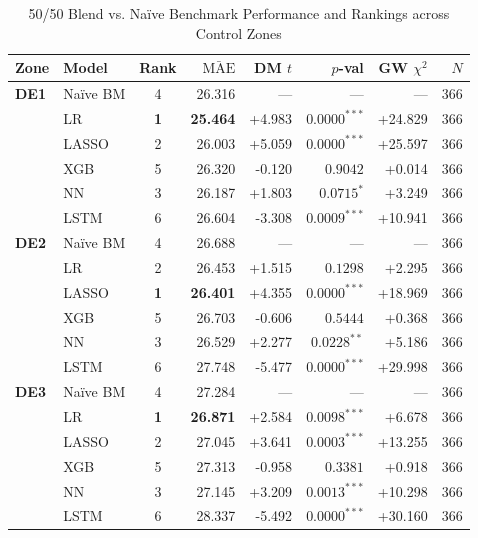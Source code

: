 \begin{table}[ht]
\centering
\caption{50/50 Blend vs. Na\"ive Benchmark Performance and Rankings across Control Zones}
\label{tab:blend_vs_bm_all_zones}
\small
\begin{tabular}{llcrrrrr}
\toprule
Zone & Model & Rank & $\bar{\text{MAE}}$ & DM $t$ & $p$-val & GW $\chi^2$ & $N$ \\
\midrule
    \textbf{DE1} & Na\"ive BM & 4 & 26.316 & — & — & — & 366 \\
                 & LR       & \textbf{1} & \textbf{25.464} & +4.983 & $0.0000^{***}$ & +24.829 & 366 \\
                 & LASSO    & 2 & 26.003 & +5.059 & $0.0000^{***}$ & +25.597 & 366 \\
                 & XGB      & 5 & 26.320 & -0.120 & $0.9042$ & +0.014 & 366 \\
                 & NN       & 3 & 26.187 & +1.803 & $0.0715^{*}$ & +3.249 & 366 \\
                 & LSTM     & 6 & 26.604 & -3.308 & $0.0009^{***}$ & +10.941 & 366 \\
    \midrule
    \textbf{DE2} & Na\"ive BM & 4 & 26.688 & — & — & — & 366 \\
                 & LR       & 2 & 26.453 & +1.515 & $0.1298$ & +2.295 & 366 \\
                 & LASSO    & \textbf{1} & \textbf{26.401} & +4.355 & $0.0000^{***}$ & +18.969 & 366 \\
                 & XGB      & 5 & 26.703 & -0.606 & $0.5444$ & +0.368 & 366 \\
                 & NN       & 3 & 26.529 & +2.277 & $0.0228^{**}$ & +5.186 & 366 \\
                 & LSTM     & 6 & 27.748 & -5.477 & $0.0000^{***}$ & +29.998 & 366 \\
    \midrule
    \textbf{DE3} & Na\"ive BM & 4 & 27.284 & — & — & — & 366 \\
                 & LR       & \textbf{1} & \textbf{26.871} & +2.584 & $0.0098^{***}$ & +6.678 & 366 \\
                 & LASSO    & 2 & 27.045 & +3.641 & $0.0003^{***}$ & +13.255 & 366 \\
                 & XGB      & 5 & 27.313 & -0.958 & $0.3381$ & +0.918 & 366 \\
                 & NN       & 3 & 27.145 & +3.209 & $0.0013^{***}$ & +10.298 & 366 \\
                 & LSTM     & 6 & 28.337 & -5.492 & $0.0000^{***}$ & +30.160 & 366 \\

\end{tabular}
\end{table}

